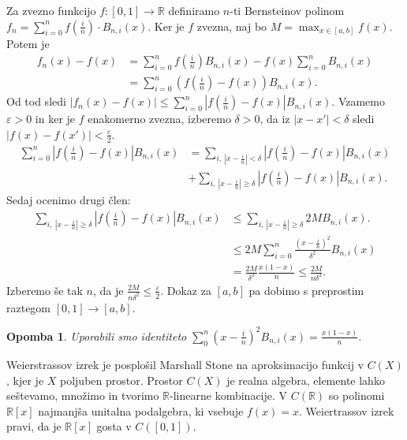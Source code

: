 \documentclass[10pt, a4paper]{article}
\newtheorem*{opomba}{Opomba}
\newcommand{\R}{\mathbb {R}}
\begin{document}
Za zvezno funkcijo $f:[0, 1] \to \R$ definiramo $n$-ti Bernsteinov polinom 
$f_n = \sum_{i= 0} ^n f\left(\frac{i}{n}\right) \cdot B_{n, i} (x)$.
Ker je $f$ zvezna, naj bo $M = \max_{x \in [a, b]} f(x)$.
Potem je
\begin{align*}
  f_n(x) - f(x) &= \sum_{i = 0} ^n f\left(\frac{i}{n}\right) B_{n, i} (x) - f(x) \sum_{i = 0}^n B_{n, i} (x)\\ 
  &= \sum_{i = 0} ^n \left(f\left(\frac{i}{n}\right) - f(x)\right) B_{n, i}(x).
\end{align*}
Od tod sledi $|f_n(x) - f(x)| \leq \sum_{i = 0} ^n \left|f\left(\frac{i}{n}\right) - f(x)\right| B_{n, i}(x).$
Vzamemo $\varepsilon > 0$ in ker je $f$ enakomerno zvezna, izberemo $\delta > 0$,
da iz $|x - x'| < \delta$ sledi $|f(x) - f(x')| <\frac{\varepsilon}{2}$.
\begin{align*}
  \sum_{i = 0} ^n \left|f\left(\frac{i}{n}\right) - f(x)\right| B_{n, i}(x)
  &= \sum_{i,\ \left| x - \frac{i}{n}\right| < \delta} \left|f\left(\frac{i}{n}\right) - f(x)\right| B_{n, i}(x)\\
  &+\sum_{i,\ \left| x - \frac{i}{n}\right| \geq \delta} \left|f\left(\frac{i}{n}\right) - f(x)\right| B_{n, i}(x).
\end{align*}
Sedaj ocenimo drugi člen:
\begin{align*}
  \sum_{i,\ \left| x - \frac{i}{n}\right| \geq \delta} \left|f\left(\frac{i}{n}\right) - f(x)\right| B_{n, i}(x) &\leq \sum_{i,\ \left| x - \frac{i}{n}\right| \geq \delta} 2M B_{n, i}(x).\\
  &\leq 2M \sum_{i = 0} ^n \frac{\left(x - \frac{i}{n}\right)^2}{\delta^2} B_{n, i} (x)\\
  &= \frac{2M}{\delta^2} \frac{x(1-x)}{n} \leq \frac{2M}{n \delta^2}.
\end{align*}
Izberemo še tak $n$, da je $\frac{2M}{n \delta^2} \leq \frac{\varepsilon}{2}$.
Dokaz za $[a, b]$ pa dobimo s preprostim raztegom $[0, 1] \to [a, b]$.

\begin{opomba}
  Uporabili smo identiteto $\sum_0 ^n \left(x - \frac{i}{n}\right)^2 B_{n, i} (x) = \frac{x(1 - x)}{n}$.
\end{opomba}

Weierstrassov izrek je posplošil Marshall Stone na aproksimacijo funkcij v $C(X)$, kjer je $X$ poljuben prostor.
Prostor $C(X)$ je realna algebra, elemente lahko seštevamo, množimo in tvorimo $\R$-linearne kombinacije.
V $C(\R)$ so polinomi $\R[x]$ najmanjša unitalna podalgebra, ki vsebuje $f(x) = x$.
Weiertrassov izrek pravi, da je $\R[x]$ gosta v $C([0, 1])$.
\end{document}
